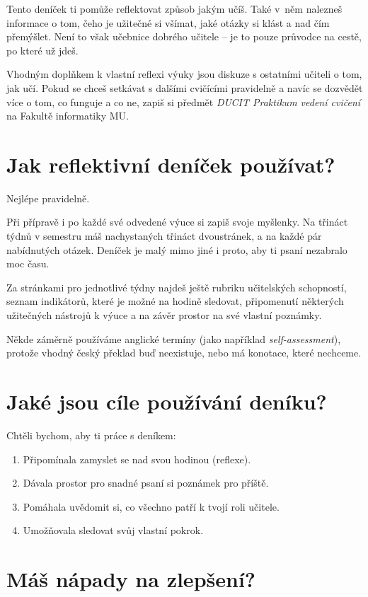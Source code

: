 \documentclass[twoside,openany]{book}
\begin{document}
Tento deníček ti pomůže reflektovat způsob jakým učíš. Také v~něm nalezneš informace o tom, čeho je užitečné si všímat, jaké otázky si klást a nad čím přemýšlet. Není to však učebnice dobrého učitele -- je to pouze průvodce na cestě, po které už jdeš.

Vhodným doplňkem k vlastní reflexi výuky jsou diskuze s ostatními učiteli o tom, jak učí. Pokud se chceš setkávat s dalšími cvičícími pravidelně a navíc se dozvědět více o tom, co funguje a co ne, zapiš si předmět \textit{DUCIT Praktikum vedení cvičení} na Fakultě informatiky MU.

\newpage
\section*{Jak reflektivní deníček používat?}

Nejlépe pravidelně.

Při přípravě i po každé své odvedené výuce si zapiš svoje myšlenky. Na třináct týdnů v semestru máš nachystaných třináct dvoustránek, a na každé pár nabídnutých otázek. Deníček je malý mimo jiné i proto, aby ti psaní nezabralo moc času.

Za stránkami pro jednotlivé týdny najdeš ještě rubriku učitelských schopností, seznam indikátorů, které je možné na hodině sledovat, připomenutí některých užitečných nástrojů k výuce a na závěr prostor na své vlastní poznámky.

Někde záměrně používáme anglické termíny (jako například \textit{self-assessment}), protože vhodný český překlad buď neexistuje, nebo má konotace, které nechceme.

\section*{Jaké jsou cíle používání deníku?}

Chtěli bychom, aby ti práce s deníkem:
\begin{enumerate}[topsep=0pt]
\item Připomínala zamyslet se nad svou hodinou (reflexe).
\item Dávala prostor pro snadné psaní si poznámek pro příště.
\item Pomáhala uvědomit si, co všechno patří k tvojí roli učitele.
\item Umožňovala sledovat svůj vlastní pokrok.
\end{enumerate}

\section*{Máš nápady na zlepšení?}
\end{document}
